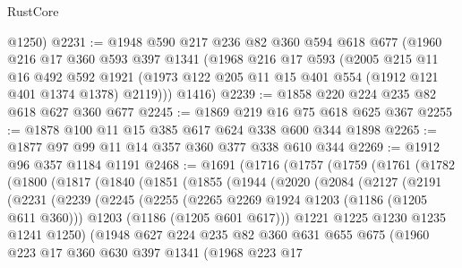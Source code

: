 \begin{lexlean}{RustCore}
\begin{coremodule}
      @1250)
@2231 := @1948
    @590
    @217
    @236
    @82
    @360
    @594
    @618
    @677
    (@1960
      @216
      @17
      @360
      @593
      @397
      @1341
      (@1968
        @216
        @17
        @593
        (@2005
          @215
          @11
          @16
          @492
          @592
          @1921
          (@1973 @122 @205 @11 @15 @401 @554 (@1912 @121 @401 @1374 @1378) @2119)))
      @1416)
@2239 := @1858 @220 @224 @235 @82 @618 @627 @360 @677
@2245 := @1869 @219 @16 @75 @618 @625 @367
@2255 := @1878 @100 @11 @15 @385 @617 @624 @338 @600 @344 @1898
@2265 := @1877 @97 @99 @11 @14 @357 @360 @377 @338 @610 @344
@2269 := @1912 @96 @357 @1184 @1191
@2468 := @1691
    (@1716
      (@1757
        (@1759
          (@1761
            (@1782
              (@1800
                (@1817
                  (@1840
                    (@1851
                      (@1855
                        (@1944
                          (@2020
                            (@2084
                              (@2127
                                (@2191
                                  (@2231
                                    (@2239
                                      (@2245
                                        (@2255
                                          (@2265 @2269 @1924 @1203 (@1186 (@1205 @611 @360)))
                                          @1203
                                          (@1186 (@1205 @601 @617)))
                                        @1221
                                        @1225
                                        @1230
                                        @1235
                                        @1241
                                        @1250)
                                      (@1948
                                        @627
                                        @224
                                        @235
                                        @82
                                        @360
                                        @631
                                        @655
                                        @675
                                        (@1960
                                          @223
                                          @17
                                          @360
                                          @630
                                          @397
                                          @1341
                                          (@1968
                                            @223
                                            @17

\end{coremodule}
\end{lexlean}
